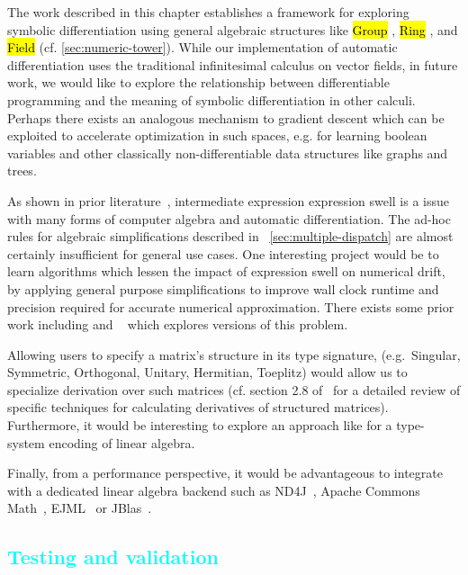 \documentclass[12pt,initial,twoside,maitrise]{dms}
\newcommand{\medium}[1]{\textcolor{cyan}{#1}}
\newcommand{\inline}[1]{%
\begingroup%
\sethlcolor{slightgray}%
\hl{\ttfamily\small #1}%
\endgroup
}
\numberwithin{equation}{section}
\numberwithin{table}{chapter}
\numberwithin{figure}{chapter}
\begin{document}
The work described in this chapter establishes a framework for exploring symbolic differentiation using general algebraic structures like \inline{Group}, \inline{Ring}, and \inline{Field} (cf. \autoref{sec:numeric-tower}). While our implementation of automatic differentiation uses the traditional infinitesimal calculus on vector fields, in future work, we would like to explore the relationship between differentiable programming and the meaning of symbolic differentiation in other calculi. Perhaps there exists an analogous mechanism to gradient descent which can be exploited to accelerate optimization in such spaces, e.g. for learning boolean variables and other classically non-differentiable data structures like graphs and trees.

As shown in prior literature~\citep{theano, baydin-survey, laue2019equivalence}, intermediate expression expression swell is a issue with many forms of computer algebra and automatic differentiation. The ad-hoc rules for algebraic simplifications described in ~\autoref{sec:multiple-dispatch} are almost certainly insufficient for general use cases. One interesting project would be to learn algorithms which lessen the impact of expression swell on numerical drift, by applying general purpose simplifications to improve wall clock runtime and precision required for accurate numerical approximation. There exists some prior work including \citet{zaremba2014learning, zaremba2016learning} and ~\citet{wang2019global} which explores versions of this problem.

Allowing users to specify a matrix's structure in its type signature, (e.g.\ Singular, Symmetric, Orthogonal, Unitary, Hermitian, Toeplitz) would allow us to specialize derivation over such matrices (cf. section 2.8 of~\citet{petersen2012matrix} for a detailed review of specific techniques for calculating derivatives of structured matrices). Furthermore, it would be interesting to explore an approach like \citet{makwana2018numlin} for a type-system encoding of linear algebra.

Finally, from a performance perspective, it would be advantageous to integrate with a dedicated linear algebra backend such as ND4J~\citep{team2016nd4j}, Apache Commons Math~\citep{developers2012apache}, EJML~\citep{abeles2010efficient} or JBlas~\citep{braun2011jblas}.

\medium{\chapter{Testing and validation}\label{ch:difftest}}
\end{document}
